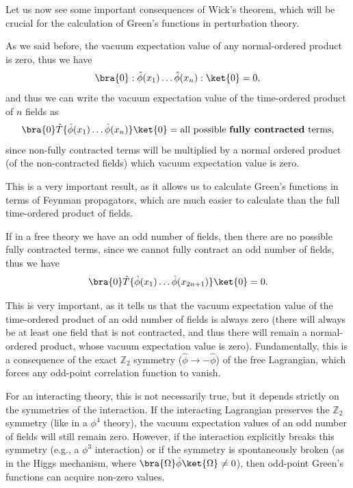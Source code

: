 Let us now see some important consequences of Wick's theorem, which will be crucial for the calculation of Green's functions in perturbation theory.

\begin{corollary}
    As we said before, the vacuum expectation value of any normal-ordered product is zero, thus we have
    \[
        \bra{0} : \hat{\phi} (x_1) \dots \hat{\phi} (x_n) : \ket{0} = 0,
    \]
    and thus we can write the vacuum expectation value of the time-ordered product of \(n\) fields as
    \[
        \bra{0} \hat{T} \{ \hat{\phi} (x_1) \dots \hat{\phi} (x_n) \} \ket{0} = \text{all possible } \textbf{fully contracted} \text{ terms},
    \]
    since non-fully contracted terms will be multiplied by a normal ordered product (of the non-contracted fields) which vacuum expectation value is zero.
\end{corollary}
This is a very important result, as it allows us to calculate Green's functions in terms of Feynman propagators, which are much easier to calculate than the full time-ordered product of fields.
\begin{corollary}
    If in a free theory we have an odd number of fields, then there are no possible fully contracted terms, since we cannot fully contract an odd number of fields, thus we have
    \[
        \bra{0} \hat{T} \{ \hat{\phi} (x_1) \dots \hat{\phi} (x_{2n+1}) \} \ket{0} = 0.
    \]
\end{corollary}
This is very important, as it tells us that the vacuum expectation value of the time-ordered product of an odd number of fields is always zero (there will always be at least one field that is not contracted, and thus there will remain a normal-ordered product, whose vacuum expectation value is zero). Fundamentally, this is a consequence of the exact \(\mathbb{Z}_2\) symmetry (\(\hat{\phi} \to -\hat{\phi}\)) of the free Lagrangian, which forces any odd-point correlation function to vanish.

For an interacting theory, this is not necessarily true, but it depends strictly on the symmetries of the interaction. If the interacting Lagrangian preserves the \(\mathbb{Z}_2\) symmetry (like in a \(\phi^4\) theory), the vacuum expectation values of an odd number of fields will still remain zero. However, if the interaction explicitly breaks this symmetry (e.g., a \(\phi^3\) interaction) or if the symmetry is spontaneously broken (as in the Higgs mechanism, where \(\bra{\Omega}\hat{\phi}\ket{\Omega} \neq 0\)), then odd-point Green's functions can acquire non-zero values.

